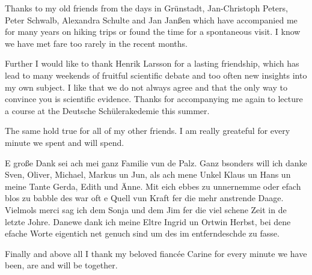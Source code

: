 
Thanks to my old friends from the days in Grünstadt,
Jan-Christoph Peters,
Peter Schwalb,
Alexandra Schulte
and
Jan Janßen
which have accompanied me for many years
on hiking trips or found the time
for a spontaneous visit.
I know we have met fare too rarely in the recent months.

Further I would like to thank Henrik Larsson
for a lasting friendship,
which has lead to many weekends of fruitful
scientific debate and too often new insights into my own subject.
I like that we do not always agree
and that the only way to convince you is scientific evidence.
Thanks for accompanying me again
to lecture a course at the Deutsche Schülerakedemie this summer.

The same hold true for all of my other friends.
I am really greateful for every minute we spent and will spend.


E große Dank sei ach
mei ganz Familie vun de Palz.
Ganz bsonders will ich danke Sven, Oliver,
Michael, Markus un Jun,
als ach mene Unkel Klaus un Hans
un meine Tante Gerda, Edith und Änne.
Mit eich ebbes zu unnernemme oder efach blos zu babble
des war oft e Quell vun Kraft fer die mehr anstrende Daage.
Vielmols merci sag ich dem Sonja und dem Jim
fer die viel schene Zeit in de letzte Johre.
Danewe dank ich meine Eltre Ingrid un Ortwin Herbst,
bei dene efache Worte eigentich net genuch sind
um des im entferndeschde zu fasse.


Finally and above all I thank my beloved fianc\'ee Carine
for every minute we have been, are and will be together.
